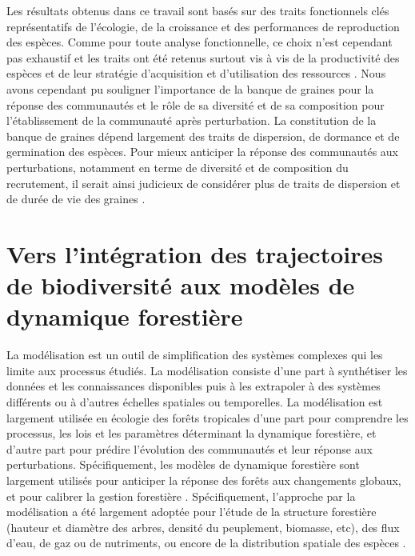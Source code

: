 \documentclass[
  11pt,
  french,
  A4paper,
  extrafontsizes,onecolumn,openright
  ]{memoir}
\begin{document}
Les résultats obtenus dans ce travail sont basés sur des traits
fonctionnels clés représentatifs de l'écologie, de la croissance et des
performances de reproduction des espèces. Comme pour toute analyse
fonctionnelle, ce choix n'est cependant pas exhaustif et les traits ont
été retenus surtout vis à vis de la productivité des espèces et de leur
stratégie d'acquisition et d'utilisation des ressources
\autocites{Reich2014}{Kunstler2016}. Nous avons cependant pu souligner
l'importance de la banque de graines pour la réponse des communautés et
le rôle de sa diversité et de sa composition pour l'établissement de la
communauté après perturbation. La constitution de la banque de graines
dépend largement des traits de dispersion, de dormance et de germination
des espèces. Pour mieux anticiper la réponse des communautés aux
perturbations, notamment en terme de diversité et de composition du
recrutement, il serait ainsi judicieux de considérer plus de traits de
dispersion et de durée de vie des graines
\autocites{Verdu2005}{Schleuning2016}.

\section{Vers l'intégration des trajectoires de biodiversité aux modèles
de dynamique
forestière}\label{vers-lintegration-des-trajectoires-de-biodiversite-aux-modeles-de-dynamique-forestiere}

La modélisation est un outil de simplification des systèmes complexes
qui les limite aux processus étudiés. La modélisation consiste d'une
part à synthétiser les données et les connaissances disponibles puis à
les extrapoler à des systèmes différents ou à d'autres échelles
spatiales ou temporelles. La modélisation est largement utilisée en
écologie des forêts tropicales d'une part pour comprendre les processus,
les lois et les paramètres déterminant la dynamique forestière, et
d'autre part pour prédire l'évolution des communautés et leur réponse
aux perturbations. Spécifiquement, les modèles de dynamique forestière
sont largement utilisés pour anticiper la réponse des forêts aux
changements globaux, et pour calibrer la gestion forestière
\autocite{Gourlet-Fleury2005}. Spécifiquement, l'approche par la
modélisation a été largement adoptée pour l'étude de la structure
forestière (hauteur et diamètre des arbres, densité du peuplement,
biomasse, etc), des flux d'eau, de gaz ou de nutriments, ou encore de la
distribution spatiale des espèces
\autocites{Piponiot2016}{Rutishauser2016}{Grimm2017}.
\end{document}
